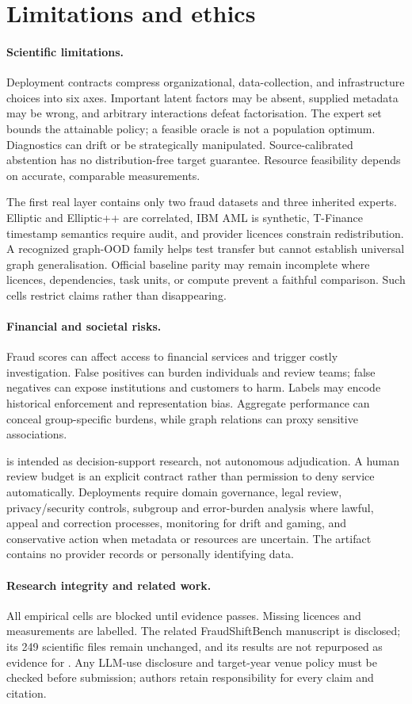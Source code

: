 \section{Limitations and ethics}

\paragraph{Scientific limitations.}
Deployment contracts compress organizational, data-collection, and infrastructure choices into six axes. Important latent factors may be absent, supplied metadata may be wrong, and arbitrary interactions defeat factorisation. The expert set bounds the attainable policy; a feasible oracle is not a population optimum. Diagnostics can drift or be strategically manipulated. Source-calibrated abstention has no distribution-free target guarantee. Resource feasibility depends on accurate, comparable measurements.

The first real layer contains only two fraud datasets and three inherited experts. Elliptic and Elliptic++ are correlated, IBM AML is synthetic, T-Finance timestamp semantics require audit, and provider licences constrain redistribution. A recognized graph-OOD family helps test transfer but cannot establish universal graph generalisation. Official baseline parity may remain incomplete where licences, dependencies, task units, or compute prevent a faithful comparison. Such cells restrict claims rather than disappearing.

\paragraph{Financial and societal risks.}
Fraud scores can affect access to financial services and trigger costly investigation. False positives can burden individuals and review teams; false negatives can expose institutions and customers to harm. Labels may encode historical enforcement and representation bias. Aggregate performance can conceal group-specific burdens, while graph relations can proxy sensitive associations.

\method{} is intended as decision-support research, not autonomous adjudication. A human review budget is an explicit contract rather than permission to deny service automatically. Deployments require domain governance, legal review, privacy/security controls, subgroup and error-burden analysis where lawful, appeal and correction processes, monitoring for drift and gaming, and conservative action when metadata or resources are uncertain. The artifact contains no provider records or personally identifying data.

\paragraph{Research integrity and related work.}
All empirical cells are blocked until evidence passes. Missing licences and measurements are labelled. The related FraudShiftBench manuscript is disclosed; its 249 scientific files remain unchanged, and its results are not repurposed as evidence for \method{}. Any LLM-use disclosure and target-year venue policy must be checked before submission; authors retain responsibility for every claim and citation.
